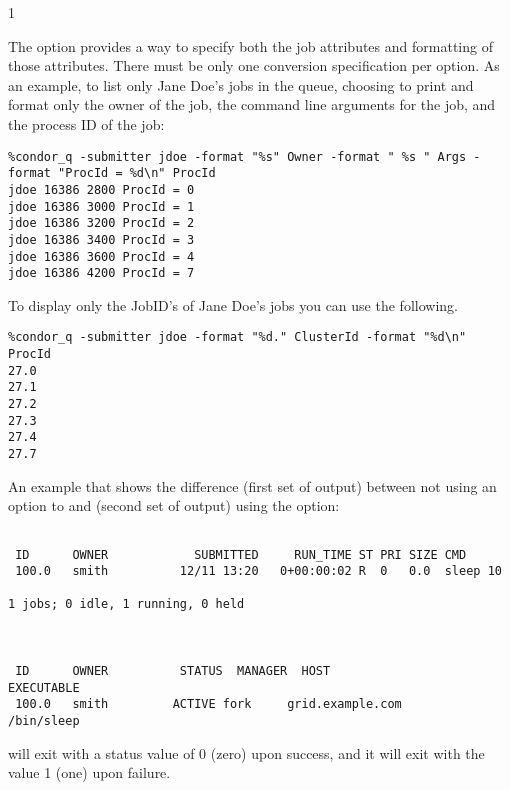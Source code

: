 \begin{ManPage}{\label{man-condor-q}}{1}
\Examples

The  option provides a way to specify both the job attributes
and formatting of those attributes.
There must be only one conversion specification per  option.
As an example, to list only Jane Doe's jobs in the queue,
choosing to print and format only the owner of the job,
the command line arguments for the job, and the
process ID of the job:
\footnotesize
\begin{verbatim}
%condor_q -submitter jdoe -format "%s" Owner -format " %s " Args -format "ProcId = %d\n" ProcId
jdoe 16386 2800 ProcId = 0
jdoe 16386 3000 ProcId = 1
jdoe 16386 3200 ProcId = 2
jdoe 16386 3400 ProcId = 3
jdoe 16386 3600 ProcId = 4
jdoe 16386 4200 ProcId = 7
\end{verbatim}
\normalsize

To display only the JobID's of Jane Doe's jobs you can use the following.
\footnotesize
\begin{verbatim}
%condor_q -submitter jdoe -format "%d." ClusterId -format "%d\n" ProcId
27.0
27.1
27.2
27.3
27.4
27.7
\end{verbatim}
\normalsize

An example that shows the difference (first set of output)
between not using an option to  and (second
set of output) using the  option:
\footnotesize
\begin{verbatim}

 ID      OWNER            SUBMITTED     RUN_TIME ST PRI SIZE CMD
 100.0   smith          12/11 13:20   0+00:00:02 R  0   0.0  sleep 10

1 jobs; 0 idle, 1 running, 0 held



 ID      OWNER          STATUS  MANAGER  HOST                EXECUTABLE
 100.0   smith         ACTIVE fork     grid.example.com       /bin/sleep
\end{verbatim}
\normalsize

\ExitStatus

 will exit with a status value of 0 (zero) upon success,
and it will exit with the value 1 (one) upon failure.

\end{ManPage}
